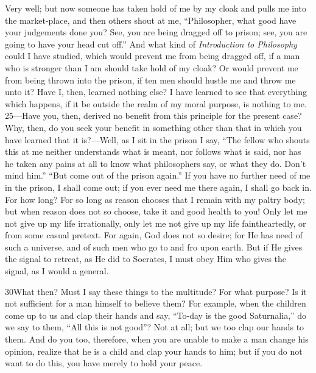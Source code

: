 Very well; but now someone has taken hold of me by my cloak and pulls me into the market-place, and then others shout at me, ``Philosopher, what good have your judgements done you? See, you are being dragged off to prison; see, you are going to have your head cut off.'' And what kind of \emph{Introduction to Philosophy} could I have studied, which would prevent me from being dragged off, if a man who is stronger than I am should take hold of my cloak? Or would prevent me from being thrown into the prison, if ten men should hustle me and throw me unto it? Have I, then, learned nothing else? I have learned to see that everything which happens, if it be outside the realm of my moral purpose, is nothing to me. 25—Have you, then, derived no benefit from this principle for the present case? Why, then, do you seek your benefit in something other than that in which you have learned that it is?—Well, as I sit in the prison I say, ``The fellow who shouts this at me neither understands what is meant, nor follows what is said, nor has he taken any pains at all to know what philosophers say, or what they do. Don't mind him.'' ``But come out of the prison again.'' If you have no further need of me in the prison, I shall come out; if you ever need me there again, I shall go back in. For how long? For so long as reason chooses that I remain with my paltry body; but when reason does not so choose, take it and good health to you! Only let me not give up my life irrationally, only let me not give up my life faintheartedly, or from some casual pretext. For again, God does not so desire; for He has need of such a universe, and of such men who go to and fro upon earth. But if He gives the signal to retreat, as He did to Socrates, I must obey Him who gives the signal, as I would a general.

30What then? Must I say these things to the multitude? For what purpose? Is it not sufficient for a man himself to believe them? For example, when the children come up to us and clap their hands and say, ``To-day is the good Saturnalia,'' do we say to them, ``All this is not good''? Not at all; but we too clap our hands to them. And do you too, therefore, when you are unable to make a man change his opinion, realize that he is a child and clap your hands to him; but if you do not want to do this, you have merely to hold your peace.

